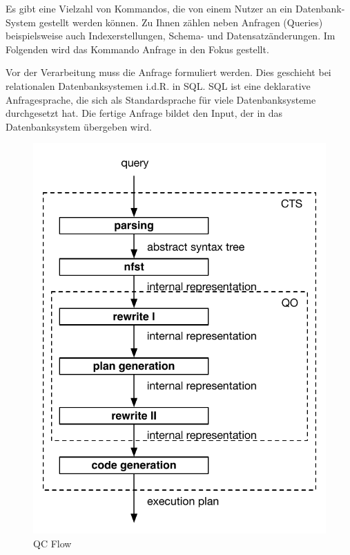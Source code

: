 Es gibt eine Vielzahl von Kommandos, die von einem Nutzer an ein Datenbank-System gestellt werden können. Zu Ihnen zählen neben Anfragen (Queries) beispielsweise auch Indexerstellungen, Schema- und Datensatzänderungen. Im Folgenden wird das Kommando Anfrage in den Fokus gestellt.

Vor der Verarbeitung muss die Anfrage formuliert werden. Dies geschieht bei relationalen Datenbanksystemen i.d.R. in \ac{SQL}. \ac{SQL} ist eine deklarative Anfragesprache, die sich als Standardsprache für viele Datenbanksysteme durchgesetzt hat. Die fertige Anfrage bildet den Input, der in das Datenbanksystem übergeben wird. 


\begin{figure}[ht]
  \centering
  \includegraphics{02_Grundlagen/QCArchitecture.pdf}
  \caption{\ac{QC} Flow}
  \label{DBMS_Interpreter}
\end{figure}


